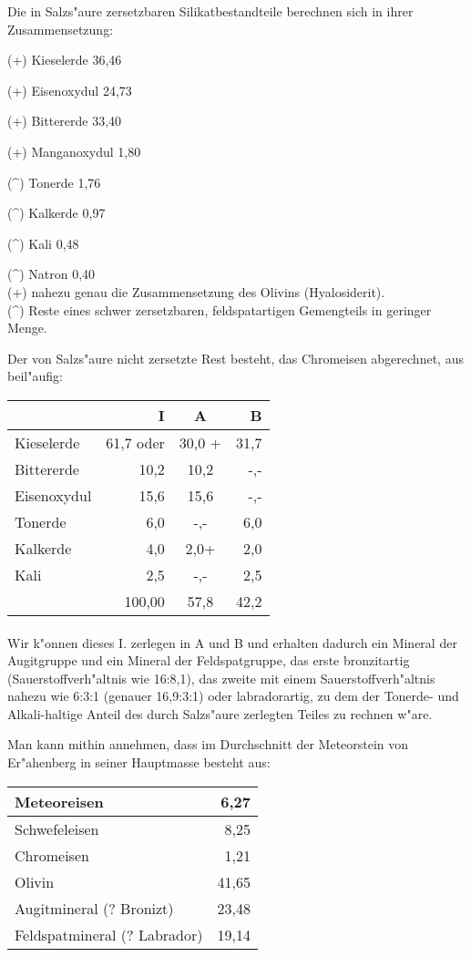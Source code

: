 \documentclass[a4paper, 11pt, oneside]{article}
\begin{document}
Die in Salzs"aure zersetzbaren Silikatbestandteile berechnen sich in ihrer Zusammensetzung:

(+) Kieselerde 36,46

(+) Eisenoxydul 24,73

(+) Bittererde 33,40

(+) Manganoxydul 1,80

(\^{}) Tonerde 1,76

(\^{}) Kalkerde 0,97

(\^{}) Kali 0,48

(\^{}) Natron 0,40\\

(+) nahezu genau die Zusammensetzung des Olivins (Hyalosiderit).\\

(\^{}) Reste eines schwer zersetzbaren, feldspatartigen Gemengteils in geringer Menge.

Der von Salzs"aure nicht zersetzte Rest besteht, das Chromeisen abgerechnet, aus beil"aufig:
\begin{center}
    \begin{tabular}{ |l|r|c|r| }
    \hline
    & I & A & B\\
    \hline\hline
    Kieselerde & 61,7 oder & 30,0 + & 31,7\\\hline
    Bittererde & 10,2 & 10,2 & -,-\\\hline
    Eisenoxydul & 15,6 & 15,6 & -,-\\\hline
    Tonerde & 6,0 & -,- & 6,0\\\hline
    Kalkerde & 4,0 & 2,0+ & 2,0\\\hline
    Kali & 2,5 & -,- & 2,5\\\hline
    & 100,00 & 57,8 & 42,2\\
    \hline
    \end{tabular}
\end{center}
\paragraph{}
Wir k"onnen dieses I. zerlegen in A und B und erhalten dadurch ein Mineral der Augitgruppe und ein Mineral der Feldspatgruppe, das erste bronzitartig (Sauerstoffverh"altnis wie 16:8,1), das zweite mit einem Sauerstoffverh"altnis nahezu wie 6:3:1 (genauer 16,9:3:1) oder labradorartig, zu dem der Tonerde- und Alkali-haltige Anteil des durch Salzs"aure zerlegten Teiles zu rechnen w"are.

Man kann mithin annehmen, dass im Durchschnitt der Meteorstein von Er"ahenberg in seiner Hauptmasse besteht aus:
\begin{center}
    \begin{tabular}{ |l|r| } 
    \hline
    Meteoreisen & 6,27\\\hline
    Schwefeleisen & 8,25\\\hline
    Chromeisen & 1,21\\\hline
    Olivin & 41,65\\\hline
    Augitmineral (? Bronizt) & 23,48\\\hline
    Feldspatmineral (? Labrador) & 19,14\\
    \hline
    \end{tabular}
\end{center}
\end{document}
